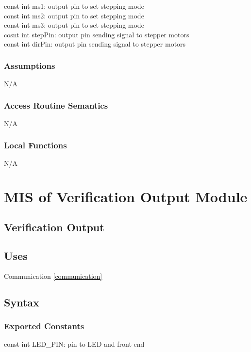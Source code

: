 \documentclass[12pt, titlepage]{article}
\begin{document}
const int ms1: output pin to set stepping mode\\
const int ms2: output pin to set stepping mode\\
const int ms3: output pin to set stepping mode\\
cosnt int stepPin: output pin sending signal to stepper motors\\
const int dirPin: output pin sending signal to stepper motors\\

\subsubsection{Assumptions}

N/A

\subsubsection{Access Routine Semantics}

N/A

\subsubsection{Local Functions}

N/A
\section{MIS of Verification Output Module} \label{verificationOutput} 

\subsection{Verification Output}

\subsection{Uses}
Communication \ref{communication}

\subsection{Syntax}

\subsubsection{Exported Constants}
const int LED\_PIN: pin to LED and front-end\\
\end{document}
